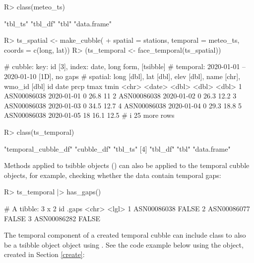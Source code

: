 \documentclass[
  shortnames]{jss}
\begin{document}
\begin{CodeChunk}
\begin{CodeInput}
R> class(meteo_ts)
\end{CodeInput}
\begin{CodeOutput}
[1] "tbl_ts"     "tbl_df"     "tbl"        "data.frame"
\end{CodeOutput}
\begin{CodeInput}
R> ts_spatial <- make_cubble(
+   spatial = stations, temporal = meteo_ts, coords = c(long, lat))
R> (ts_temporal <- face_temporal(ts_spatial))
\end{CodeInput}
\begin{CodeOutput}
# cubble:   key: id [3], index: date, long form, [tsibble]
# temporal: 2020-01-01 -- 2020-01-10 [1D], no gaps
# spatial:  long [dbl], lat [dbl], elev [dbl], name [chr], wmo_id [dbl]
  id          date        prcp  tmax  tmin
  <chr>       <date>     <dbl> <dbl> <dbl>
1 ASN00086038 2020-01-01     0  26.8  11  
2 ASN00086038 2020-01-02     0  26.3  12.2
3 ASN00086038 2020-01-03     0  34.5  12.7
4 ASN00086038 2020-01-04     0  29.3  18.8
5 ASN00086038 2020-01-05    18  16.1  12.5
# i 25 more rows
\end{CodeOutput}
\begin{CodeInput}
R> class(ts_temporal)
\end{CodeInput}
\begin{CodeOutput}
[1] "temporal_cubble_df" "cubble_df"          "tbl_ts"            
[4] "tbl_df"             "tbl"                "data.frame"        
\end{CodeOutput}
\end{CodeChunk}

Methods applied to tsibble objects () can also be applied to the temporal cubble objects, for example, checking whether the data contain temporal gaps:

\begin{CodeChunk}
\begin{CodeInput}
R> ts_temporal |> has_gaps()
\end{CodeInput}
\begin{CodeOutput}
# A tibble: 3 x 2
  id          .gaps
  <chr>       <lgl>
1 ASN00086038 FALSE
2 ASN00086077 FALSE
3 ASN00086282 FALSE
\end{CodeOutput}
\end{CodeChunk}

The temporal component of a created temporal cubble can include class  to also be a tsibble object  object using . See the code example below using the  object, created in Section \ref{create}:
\end{document}
